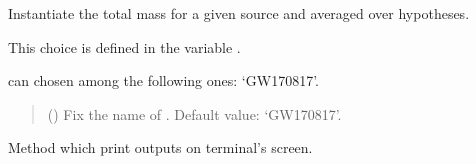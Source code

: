 \documentclass[letterpaper,10pt,english]{sphinxmanual}
\begin{document}
\begin{fulllineitems}
\label{\detokenize{source/api/setup_astro_mtot:nucleardatapy.setup_astro_mtot.SetupAstroMtotAverage}}
\pysigstartsignatures
\pysiglinewithargsret
{}
{}
{}
\pysigstopsignatures
\sphinxAtStartPar
Instantiate the total mass for a given source and averaged over hypotheses.

\sphinxAtStartPar
This choice is defined in the variable .

\sphinxAtStartPar
{} can chosen among the following ones: ‘GW170817’.
\begin{quote}\begin{description}
\sphinxAtStartPar
{} (\sphinxstyleliteralemphasis{\sphinxupquote{, }}) \textendash{} Fix the name of . Default value: ‘GW170817’.

\end{description}\end{quote}

\sphinxAtStartPar
{}

\begin{fulllineitems}
\label{\detokenize{source/api/setup_astro_mtot:nucleardatapy.setup_astro_mtot.SetupAstroMtotAverage.print_outputs}}
\pysigstartsignatures
\pysiglinewithargsret
{}
{}
{}
\pysigstopsignatures
\sphinxAtStartPar
Method which print outputs on terminal’s screen.

\end{fulllineitems}


\end{fulllineitems}

\end{document}
